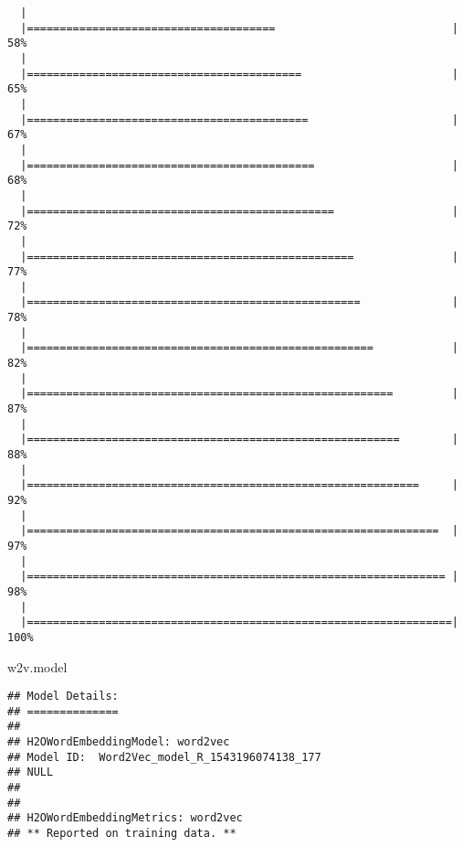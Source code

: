 \documentclass[]{article}
\newenvironment{Shaded}{\begin{snugshade}}{\end{snugshade}}
\newcommand{\NormalTok}[1]{{#1}}
\begin{document}
\begin{verbatim}
  |                                                                       
  |======================================                           |  58%
  |                                                                       
  |==========================================                       |  65%
  |                                                                       
  |===========================================                      |  67%
  |                                                                       
  |============================================                     |  68%
  |                                                                       
  |===============================================                  |  72%
  |                                                                       
  |==================================================               |  77%
  |                                                                       
  |===================================================              |  78%
  |                                                                       
  |=====================================================            |  82%
  |                                                                       
  |========================================================         |  87%
  |                                                                       
  |=========================================================        |  88%
  |                                                                       
  |============================================================     |  92%
  |                                                                       
  |===============================================================  |  97%
  |                                                                       
  |================================================================ |  98%
  |                                                                       
  |=================================================================| 100%
\end{verbatim}

\begin{Shaded}
\begin{Highlighting}[]
\NormalTok{w2v.model}
\end{Highlighting}
\end{Shaded}

\begin{verbatim}
## Model Details:
## ==============
## 
## H2OWordEmbeddingModel: word2vec
## Model ID:  Word2Vec_model_R_1543196074138_177 
## NULL
## 
## 
## H2OWordEmbeddingMetrics: word2vec
## ** Reported on training data. **
\end{verbatim}
\end{document}
